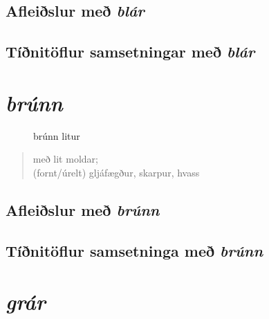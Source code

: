 \documentclass[12pt,b5paper,twosided,openany]{book}
\begin{document}
\section{Afleiðslur með \textit{blár}}
\label{afl:blafl}


\section{Tíðnitöflur samsetningar með \textit{blár}}
\label{tidni:blatid}


\chapter{\textit{brúnn}}
\label{kafli:brunn}

\begin{figure}[H]
\begin{tcolorbox}
	\centering
\end{tcolorbox}
	\caption{brúnn litur}
	\label{mynd:brunt}
\end{figure}

\begin{quote}
með lit moldar; \\
(fornt/úrelt) gljáfægður, skarpur, hvass
\end{quote}
\clearpage

\section{Afleiðslur með \textit{brúnn}}
\label{afl:brunafl}


\section{Tíðnitöflur samsetninga með \textit{brúnn}}
\label{tidni:bruntid}


\chapter{\textit{grár}}
\label{kafli:grar}
\end{document}
